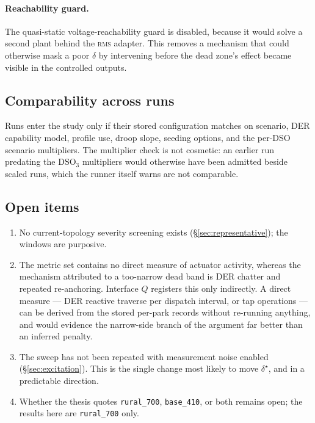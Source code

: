 \documentclass[11pt,a4paper]{article}
\newcommand{\rms}{\textsc{rms}}
\newcommand{\dz}{\ensuremath{\delta}}
\begin{document}
\paragraph{Reachability guard.} The quasi-static voltage-reachability guard is
disabled, because it would solve a second plant behind the \rms{} adapter. This
removes a mechanism that could otherwise mask a poor $\dz$ by intervening
before the dead zone's effect became visible in the controlled outputs.

\subsection{Comparability across runs}
\label{sec:comparability}

Runs enter the study only if their stored configuration matches on scenario, DER
capability model, profile use, droop slope, seeding options, and the per-DSO
scenario multipliers. The multiplier check is not cosmetic: an earlier run
predating the $\mathrm{DSO}_3$ multipliers would otherwise have been admitted
beside scaled runs, which the runner itself warns are not comparable.

\subsection{Open items}

\begin{enumerate}
  \item No current-topology severity screening exists
    (\S\ref{sec:representative}); the windows are purposive.
  \item The metric set contains no direct measure of actuator activity, whereas
    the mechanism attributed to a too-narrow dead band is DER chatter and
    repeated re-anchoring. Interface $Q$ registers this only indirectly. A
    direct measure --- DER reactive traverse per dispatch interval, or tap
    operations --- can be derived from the stored per-park records without
    re-running anything, and would evidence the narrow-side branch of the
    argument far better than an inferred penalty.
  \item The sweep has not been repeated with measurement noise enabled
    (\S\ref{sec:excitation}). This is the single change most likely to move
    $\dz^\star$, and in a predictable direction.
  \item Whether the thesis quotes \texttt{rural\_700}, \texttt{base\_410}, or
    both remains open; the results here are \texttt{rural\_700} only.
\end{enumerate}
\end{document}
